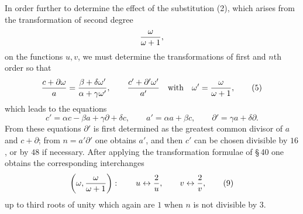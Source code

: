 \documentclass[11pt]{article}
\begin{document}
In order further to determine the effect of the substitution (2), which arises from the transformation of second degree
\[
 {\omega\over\omega+1},
\]
on the functions $u,v$, we must determine the transformations of first and $n$th order so that
\begin{equation}
 {c+\partial\omega\over a}
 ={\beta+\delta\omega'\over\alpha+\gamma\omega'},
 \qquad
 {c'+\partial'\omega'
  \over a'}
\quad\hbox{with}\quad
\omega'={\omega\over\omega+1},
\tag{5}
\end{equation}
which leads to the equations
\begin{equation}
 c'=\alpha c-\beta a+\gamma\partial+\delta c,
 \qquad
 a'=\alpha a+\beta c,
 \qquad
 \partial'=\gamma a+\delta\partial.
\tag{6}
\end{equation}
From these equations $\partial'$ is first determined as the greatest common divisor of $a$ and $c+\partial$; from $n=a'\partial'$ one obtains $a'$, and then $c'$ can be chosen divisible by $16$, or by $48$ if necessary. After applying the transformation formulae of \S\,40 one obtains the corresponding interchanges
\begin{equation}
 \left(\omega,{\omega\over\omega+1}\right):
 \qquad u\leftrightarrow {2\over u},
 \qquad v\leftrightarrow {2\over v},
\tag{9}
\end{equation}
up to third roots of unity which again are $1$ when $n$ is not divisible by $3$.
\end{document}
